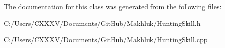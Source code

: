 The documentation for this class was generated from the following files\+:\begin{DoxyCompactItemize}
\item 
C\+:/\+Users/\+C\+X\+X\+X\+V/\+Documents/\+Git\+Hub/\+Makhluk/Hunting\+Skill.\+h\item 
C\+:/\+Users/\+C\+X\+X\+X\+V/\+Documents/\+Git\+Hub/\+Makhluk/Hunting\+Skill.\+cpp\end{DoxyCompactItemize}
